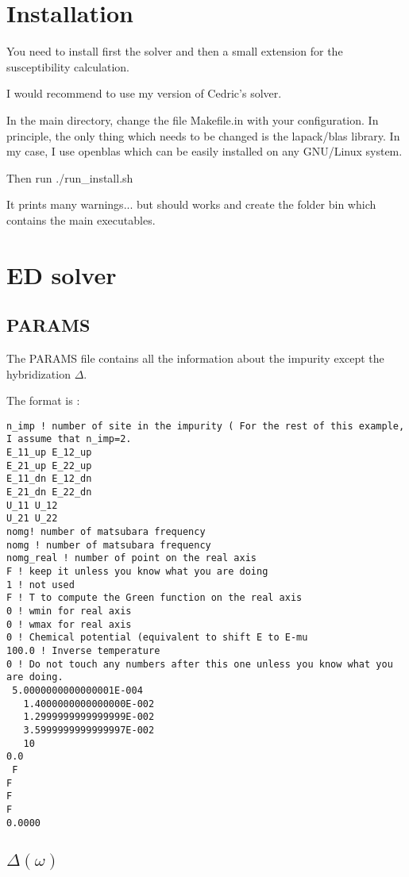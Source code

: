 \documentclass{book}
\def\D{\Delta}
\def\w{\omega}
\begin{document}
\section{Installation}


You need to install first the solver and then a small extension for the susceptibility calculation.

I would recommend to use my version of Cedric's solver.

In the main directory, change the file Makefile.in with your configuration. In principle, the only thing which needs to be changed is the lapack/blas library. In my case, I use openblas which can be easily installed on any GNU/Linux system.

Then run ./run\_install.sh

It prints many warnings... but should works and create the folder bin which contains the main executables.


\section{ED solver}

\subsection{PARAMS}

The PARAMS file contains all the information about the impurity except the hybridization $\Delta$.

The format is :
\begin{lstlisting}
n_imp ! number of site in the impurity ( For the rest of this example, I assume that n_imp=2.
E_11_up E_12_up
E_21_up E_22_up
E_11_dn E_12_dn
E_21_dn E_22_dn
U_11 U_12
U_21 U_22
nomg! number of matsubara frequency
nomg ! number of matsubara frequency
nomg_real ! number of point on the real axis
F ! keep it unless you know what you are doing
1 ! not used
F ! T to compute the Green function on the real axis
0 ! wmin for real axis
0 ! wmax for real axis
0 ! Chemical potential (equivalent to shift E to E-mu
100.0 ! Inverse temperature
0 ! Do not touch any numbers after this one unless you know what you are doing.
 5.0000000000000001E-004
   1.4000000000000000E-002
   1.2999999999999999E-002
   3.5999999999999997E-002
   10
0.0
 F
F
F
F
0.0000
\end{lstlisting}



\subsection{$\D(\w)$}
\end{document}
